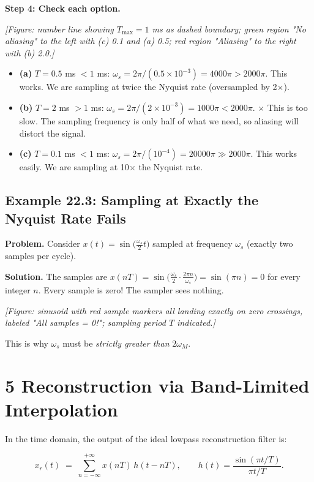 \documentclass[11pt]{article}
\begin{document}
\textbf{Step 4: Check each option.}

\textit{[Figure: number line showing $T_\text{max} = 1$ ms as dashed boundary; green region "No aliasing" to the left with (c) 0.1 and (a) 0.5; red region "Aliasing" to the right with (b) 2.0.]}

\begin{itemize}
  \item \textbf{(a)} $T = 0.5$ ms $< 1$ ms: $\omega_s = 2\pi/(0.5 \times 10^{-3}) = 4000\pi > 2000\pi$. \checkmark This works. We are sampling at twice the Nyquist rate (oversampled by 2$\times$).
  \item \textbf{(b)} $T = 2$ ms $> 1$ ms: $\omega_s = 2\pi/(2 \times 10^{-3}) = 1000\pi < 2000\pi$. $\times$ This is too slow. The sampling frequency is only half of what we need, so aliasing will distort the signal.
  \item \textbf{(c)} $T = 0.1$ ms $< 1$ ms: $\omega_s = 2\pi/(10^{-4}) = 20000\pi \gg 2000\pi$. \checkmark This works easily. We are sampling at 10$\times$ the Nyquist rate.
\end{itemize}

\subsection*{Example 22.3: Sampling at Exactly the Nyquist Rate Fails}

\textbf{Problem.} Consider $x(t) = \sin\!\big(\tfrac{\omega_s}{2}t\big)$ sampled at frequency $\omega_s$ (exactly two samples per cycle).

\textbf{Solution.} The samples are $x(nT) = \sin\!\big(\tfrac{\omega_s}{2}\cdot\tfrac{2\pi n}{\omega_s}\big) = \sin(\pi n) = 0$ for every integer $n$. Every sample is zero! The sampler sees nothing.

\textit{[Figure: sinusoid with red sample markers all landing exactly on zero crossings, labeled "All samples = 0!"; sampling period $T$ indicated.]}

This is why $\omega_s$ must be \textit{strictly greater than} $2\omega_M$.

\section*{5 Reconstruction via Band-Limited Interpolation}

In the time domain, the output of the ideal lowpass reconstruction filter is:

\[x_r(t) \;=\; \sum_{n=-\infty}^{+\infty} x(nT)\,h(t - nT), \qquad h(t) = \frac{\sin(\pi t/T)}{\pi t/T}. \tag{5}\]
\end{document}
